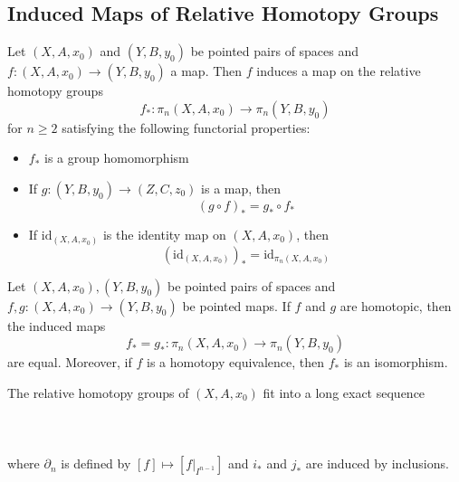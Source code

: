 \documentclass[a4paper]{article}
\begin{document}
\subsection{Induced Maps of Relative Homotopy Groups}
\begin{thm}{}{} Let $(X,A,x_0)$ and $(Y,B,y_0)$ be pointed pairs of spaces and $f:(X,A,x_0)\to(Y,B,y_0)$ a map. Then $f$ induces a map on the relative homotopy groups $$f_\ast:\pi_n(X,A,x_0)\to\pi_n(Y,B,y_0)$$ for $n\geq 2$ satisfying the following functorial properties: 
\begin{itemize}
\item $f_\ast$ is a group homomorphism
\item If $g:(Y,B,y_0)\to(Z,C,z_0)$ is a map, then $$(g\circ f)_\ast=g_\ast\circ f_\ast$$
\item If $\text{id}_{(X,A,x_0)}$ is the identity map on $(X,A,x_0)$, then $$(\text{id}_{(X,A,x_0)})_\ast=\text{id}_{\pi_n(X,A,x_0)}$$
\end{itemize}
\end{thm}

\begin{prp}{}{} Let $(X,A,x_0),(Y,B,y_0)$ be pointed pairs of spaces and $f,g:(X,A,x_0)\to (Y,B,y_0)$ be pointed maps. If $f$ and $g$ are homotopic, then the induced maps $$f_\ast=g_\ast:\pi_n(X,A,x_0)\to\pi_n(Y,B,y_0)$$ are equal. Moreover, if $f$ is a homotopy equivalence, then $f_\ast$ is an isomorphism. 
\end{prp}

\begin{prp}{}{} The relative homotopy groups of $(X,A,x_0)$ fit into a long exact sequence \\~\\
\\~\\
where $\partial_n$ is defined by $[f]\mapsto [f|_{I^{n-1}}]$ and $i_\ast$ and $j_\ast$ are induced by inclusions. 
\end{prp}
\end{document}
